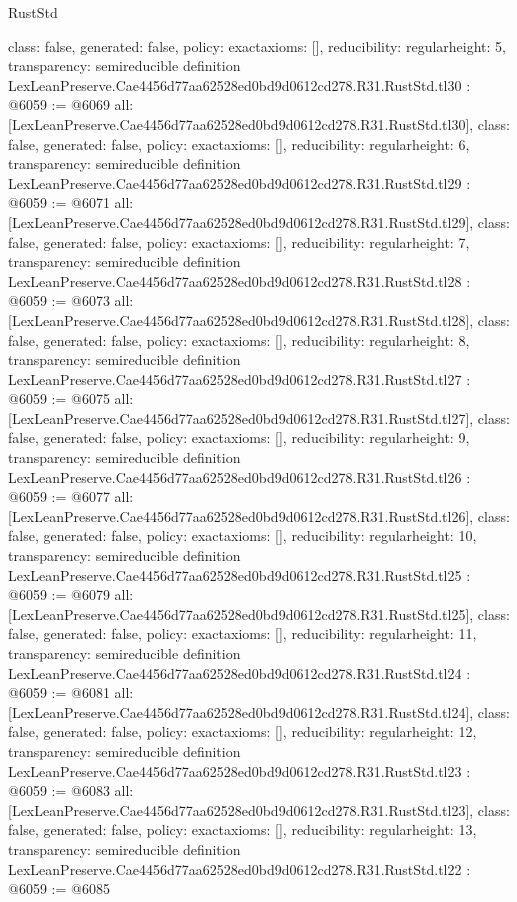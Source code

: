 \begin{lexlean}{RustStd}
\begin{coremodule}
{  class: false,
  generated: false,
  policy: exact{axioms: []},
  reducibility: regular{height: 5},
  transparency: semireducible
}
definition LexLeanPreserve.Cae4456d77aa62528ed0bd9d0612cd278.R31.RustStd.tl30 : @6059 := @6069 {
  all: [LexLeanPreserve.Cae4456d77aa62528ed0bd9d0612cd278.R31.RustStd.tl30],
  class: false,
  generated: false,
  policy: exact{axioms: []},
  reducibility: regular{height: 6},
  transparency: semireducible
}
definition LexLeanPreserve.Cae4456d77aa62528ed0bd9d0612cd278.R31.RustStd.tl29 : @6059 := @6071 {
  all: [LexLeanPreserve.Cae4456d77aa62528ed0bd9d0612cd278.R31.RustStd.tl29],
  class: false,
  generated: false,
  policy: exact{axioms: []},
  reducibility: regular{height: 7},
  transparency: semireducible
}
definition LexLeanPreserve.Cae4456d77aa62528ed0bd9d0612cd278.R31.RustStd.tl28 : @6059 := @6073 {
  all: [LexLeanPreserve.Cae4456d77aa62528ed0bd9d0612cd278.R31.RustStd.tl28],
  class: false,
  generated: false,
  policy: exact{axioms: []},
  reducibility: regular{height: 8},
  transparency: semireducible
}
definition LexLeanPreserve.Cae4456d77aa62528ed0bd9d0612cd278.R31.RustStd.tl27 : @6059 := @6075 {
  all: [LexLeanPreserve.Cae4456d77aa62528ed0bd9d0612cd278.R31.RustStd.tl27],
  class: false,
  generated: false,
  policy: exact{axioms: []},
  reducibility: regular{height: 9},
  transparency: semireducible
}
definition LexLeanPreserve.Cae4456d77aa62528ed0bd9d0612cd278.R31.RustStd.tl26 : @6059 := @6077 {
  all: [LexLeanPreserve.Cae4456d77aa62528ed0bd9d0612cd278.R31.RustStd.tl26],
  class: false,
  generated: false,
  policy: exact{axioms: []},
  reducibility: regular{height: 10},
  transparency: semireducible
}
definition LexLeanPreserve.Cae4456d77aa62528ed0bd9d0612cd278.R31.RustStd.tl25 : @6059 := @6079 {
  all: [LexLeanPreserve.Cae4456d77aa62528ed0bd9d0612cd278.R31.RustStd.tl25],
  class: false,
  generated: false,
  policy: exact{axioms: []},
  reducibility: regular{height: 11},
  transparency: semireducible
}
definition LexLeanPreserve.Cae4456d77aa62528ed0bd9d0612cd278.R31.RustStd.tl24 : @6059 := @6081 {
  all: [LexLeanPreserve.Cae4456d77aa62528ed0bd9d0612cd278.R31.RustStd.tl24],
  class: false,
  generated: false,
  policy: exact{axioms: []},
  reducibility: regular{height: 12},
  transparency: semireducible
}
definition LexLeanPreserve.Cae4456d77aa62528ed0bd9d0612cd278.R31.RustStd.tl23 : @6059 := @6083 {
  all: [LexLeanPreserve.Cae4456d77aa62528ed0bd9d0612cd278.R31.RustStd.tl23],
  class: false,
  generated: false,
  policy: exact{axioms: []},
  reducibility: regular{height: 13},
  transparency: semireducible
}
definition LexLeanPreserve.Cae4456d77aa62528ed0bd9d0612cd278.R31.RustStd.tl22 : @6059 := @6085 {
}
\end{coremodule}
\end{lexlean}
